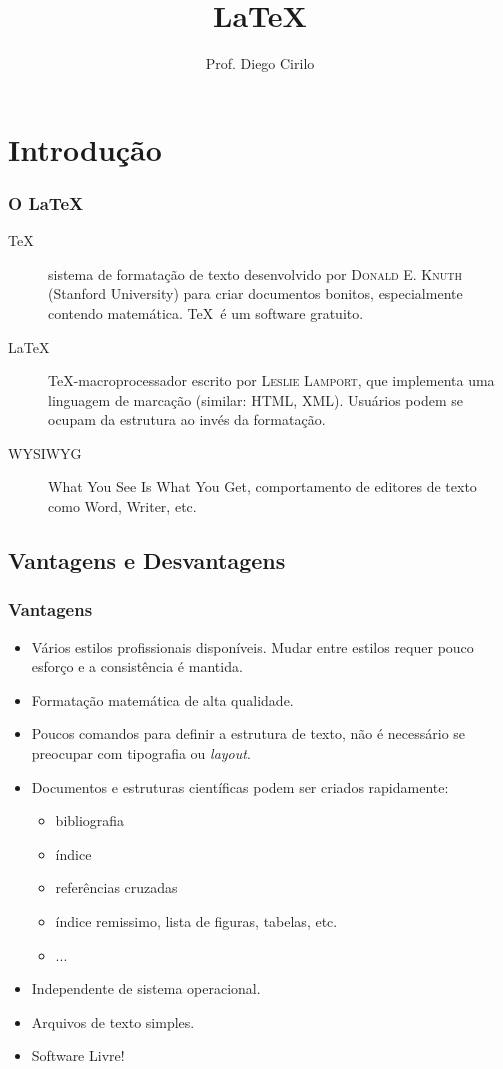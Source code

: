 \documentclass[10pt]{beamer}
\title{\LaTeX}
\institute{IFRN - Campus Mossoró}
\author{Prof. Diego Cirilo}
\date{}
\begin{document}
\frame{\titlepage}

\section{Introdução}
\begin{frame}
  \frametitle{O \LaTeX}
  \begin{description}
    \item[\TeX]{sistema de formatação de texto desenvolvido por
        \textsc{Donald E. Knuth} (Stanford University) para criar documentos
        bonitos, especialmente contendo matemática. \TeX\ é um software gratuito.}
    \item[\LaTeX]{\TeX -macroprocessador escrito por \textsc{Leslie
        Lamport}, que implementa uma linguagem de marcação (similar: HTML, XML).
      Usuários podem se ocupam da estrutura ao invés da formatação.}
    \item[WYSIWYG]{What You See Is What You Get, comportamento de editores de texto
      como Word, Writer, etc.}
  \end{description}
\end{frame}

\subsection{Vantagens e Desvantagens}

\begin{frame}
  \frametitle{Vantagens}
  \begin{itemize}[<+->]
     \item{Vários estilos profissionais disponíveis.
         Mudar entre estilos requer pouco esforço e a consistência é mantida.}
     \item{Formatação matemática de alta qualidade.}
     \item{Poucos comandos para definir a estrutura de texto, não é necessário se
       preocupar com tipografia ou \textit{layout}.}
     \item{Documentos e estruturas científicas podem ser criados rapidamente:
         \begin{itemize}
           \item{bibliografia}
           \item{índice}
           \item{referências cruzadas}
           \item{índice remissimo, lista de figuras, tabelas, etc.}
           \item{...}
         \end{itemize} }
     \item{Independente de sistema operacional.}
     \item{Arquivos de texto simples.}
     \item{Software Livre!}
  \end{itemize}
\end{frame}
\end{document}
